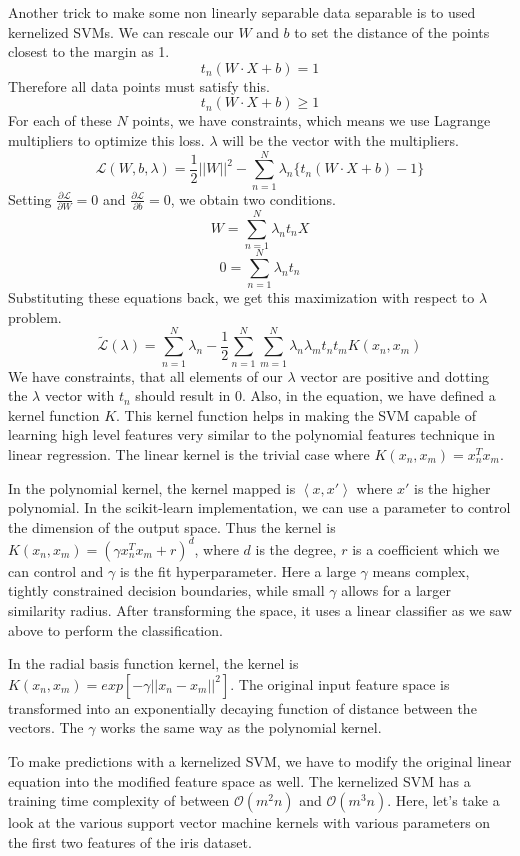 \documentclass{article}
\newcommand{\code}[1]{{\fontfamily{zi4} \selectfont{#1}}}
\begin{document}
Another trick to make some non linearly separable data separable is to used kernelized SVMs. We can rescale our $W$ and $b$ to set the distance of the points closest to the margin as 1.
$$t_n (W \cdot X + b) = 1$$
Therefore all data points must satisfy this.
$$t_n (W \cdot X + b) \geq 1$$
For each of these $N$ points, we have constraints, which means we use Lagrange multipliers to optimize this loss. $\lambda$ will be the vector with the multipliers.
$$\mathcal{L}(W, b, \lambda) = \frac{1}{2} ||W||^2 - \sum_{n=1}^N \lambda_n \{ t_n (W \cdot X + b) - 1\}$$
Setting $\frac{\partial \mathcal{L}}{\partial W} = 0$ and $\frac{\partial \mathcal{L}}{\partial b} = 0$, we obtain two conditions.
$$W = \sum_{n=1}^N \lambda_n t_n X$$
$$0 = \sum_{n=1}^N \lambda_n t_n$$
Substituting these equations back, we get this maximization with respect to $\lambda$ problem.
$$\tilde{\mathcal{L}}(\lambda) = \sum_{n=1}^N \lambda_n - \frac{1}{2} \sum_{n=1}^N \sum_{m=1}^N \lambda_n \lambda_m t_n t_m K(x_n, x_m)$$
We have constraints, that all elements of our $\lambda$ vector are positive and dotting the $\lambda$ vector with $t_n$ should result in $0$. Also, in the equation, we have defined a kernel function $K$. This kernel function helps in making the SVM capable of learning high level features very similar to the polynomial features technique in linear regression. The linear kernel is the trivial case where $K(x_n, x_m) = x_n^T x_m$.

In the polynomial kernel, the kernel mapped is $\left\langle x, x' \right\rangle$ where $x'$ is the higher polynomial. In the scikit-learn implementation, we can use a parameter \code{degree} to control the dimension of the output space. Thus the kernel is $K(x_n, x_m) = (\gamma x_n^Tx_m + r)^d$, where $d$ is the degree, $r$ is a coefficient which we can control and $\gamma$ is the fit hyperparameter. Here a large $\gamma$ means complex, tightly constrained decision boundaries, while small $\gamma$ allows for a larger similarity radius. After transforming the space, it uses a linear classifier as we saw above to perform the classification. 

In the radial basis function kernel, the kernel is $K(x_n, x_m) = exp[-\gamma ||x_n-x_m||^2]$. The original input feature space is transformed into an exponentially decaying function of distance between the vectors. The $\gamma$ works the same way as the polynomial kernel.

To make predictions with a kernelized SVM, we have to modify the original linear equation into the modified feature space as well. The kernelized SVM has a training time complexity of between $\mathcal{O}(m^2n)$ and $\mathcal{O}(m^3n)$. Here, let's take a look at the various support vector machine kernels with various parameters on the first two features of the iris dataset.
\end{document}
